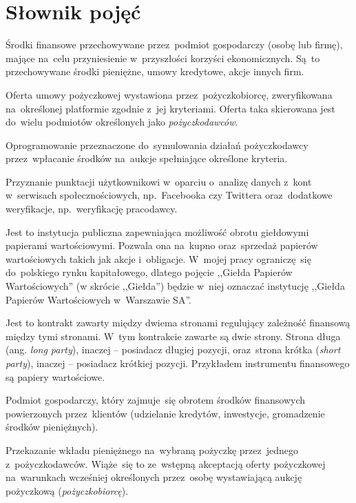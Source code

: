\documentclass[a4paper,twoside,titlepage,openright]{book}
\begin{document}
\chapter*{Słownik pojęć}
\begin{description}[style=nextline]
	\item[Aktywa finansowe] Środki finansowe przechowywane przez~podmiot gospodarczy (osobę lub firmę), mające na~celu przyniesienie w~przyszłości korzyści ekonomicznych. Są~to przechowywane środki pieniężne, umowy kredytowe, akcje innych firm.
	\item[Aukcja pożyczkowa] Oferta umowy pożyczkowej wystawiona przez~pożyczkobiorcę, zweryfikowana na~określonej platformie zgodnie z~jej kryteriami. Oferta taka skierowana jest do~wielu podmiotów określonych jako \textit{pożyczkodawców}.
	\item[Automat inwestycyjny] Oprogramowanie przeznaczone do~symulowania działań pożyczkodawcy przez~wpłacanie środków na~aukcje spełniające określone kryteria.
	\item[FriendlyScore] Przyznanie punktacji użytkownikowi w~oparciu o~analizę danych z~kont w~serwisach społecznościowych, np.~Facebooka czy Twittera oraz~dodatkowe weryfikacje, np.~weryfikację pracodawcy.
	\item[Giełda Papierów Wartościowych] Jest to instytucja publiczna zapewniająca możliwość obrotu giełdowymi papierami wartościowymi. Pozwala ona na~kupno oraz~sprzedaż papierów wartościowych takich jak akcje i~obligacje. W~mojej pracy ograniczę~się do~polskiego rynku kapitałowego, dlatego pojęcie ,,Giełda Papierów Wartościowych'' (w skrócie ,,Giełda'') będzie w~niej oznaczać instytucję ,,Giełda Papierów Wartościowych w~Warszawie SA''.\cite{gielda}
	\item[Instrument finansowy (ang. \textit{financial instrument})]  Jest to kontrakt zawarty między dwiema stronami regulujący zależność finansową między tymi stronami. W~tym kontrakcie zawarte są dwie strony. Strona długa (ang. \textit{long party}), inaczej -- posiadacz długiej pozycji, oraz~strona krótka (\textit{short party}), inaczej -- posiadacz krótkiej pozycji. Przykładem instrumentu finansowego są papiery wartościowe.\cite{inwestycje}
	\item[Instytucja finansowa] Podmiot gospodarczy, który zajmuje~się obrotem środków finansowych powierzonych przez~klientów (udzielanie kredytów, inwestycje, gromadzenie środków pieniężnych).
	\item[Oferta inwestycyjna] Przekazanie wkładu pieniężnego na~wybraną pożyczkę przez~jednego z~pożyczkodawców. Wiąże~się to ze~wstępną akceptacją oferty pożyczkowej na~warunkach wcześniej określonych przez~osobę wystawiającą aukcję pożyczkową (\textit{pożyczkobiorcę}).

\end{description}
\end{document}
